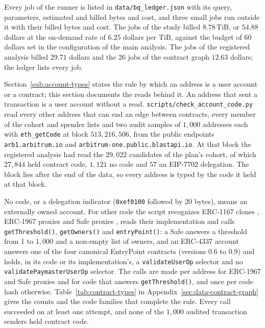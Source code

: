 Every job of the runner is listed in \texttt{data/bq\_ledger.json} with its query, parameters, estimated and billed bytes and cost, and three small jobs run outside it with their billed bytes and cost. The jobs of the study billed $8.78$\,TiB, or $54.88$ dollars at the on-demand rate of $6.25$ dollars per TiB, against the budget of $60$ dollars set in the configuration of the main analysis. The jobs of the registered analysis billed $29.71$ dollars and the 26 jobs of the contract graph $12.63$ dollars; the ledger lists every job.


Section~\ref{sub:account-types} states the rule by which an address is a user account or a contract; this section documents the reads behind it. An address that sent a transaction is a user account without a read. \texttt{scripts/check\_account\_code.py} read every other address that can end an edge between contracts, every member of the cohort and spender lists and two audit samples of $1{,}000$ addresses each with \texttt{eth\_getCode} at block $513{,}216{,}506$, from the public endpoints \texttt{arb1.arbitrum.io} and \texttt{arbitrum-one.public.blastapi.io}. At that block the registered analysis had read the $29{,}022$ candidates of the plan's cohort, of which $27{,}844$ held contract code, $1{,}121$ no code and $57$ an EIP-7702 delegation. The block lies after the end of the data, so every address is typed by the code it held at that block.

No code, or a delegation indicator (\texttt{0xef0100} followed by 20 bytes), means an externally owned account. For other code the script recognizes ERC-1167 clones \parencite{murray2018erc1167}, ERC-1967 proxies \parencite{palladino2019erc1967} and Safe proxies \parencite{safenddocs}, reads their implementation and calls \texttt{getThreshold()}, \texttt{getOwners()} and \texttt{entryPoint()}: a Safe answers a threshold from 1 to $1{,}000$ and a non-empty list of owners, and an ERC-4337 account \parencite{buterin2021erc4337} answers one of the four canonical EntryPoint contracts (versions 0.6 to 0.9) and holds, in its code or its implementation's, a \texttt{validateUserOp} selector and no \texttt{validatePaymasterUserOp} selector. The calls are made per address for ERC-1967 and Safe proxies and for code that answers \texttt{getThreshold()}, and once per code hash otherwise. Table~\ref{tab:contract-types} in Appendix~\ref{sec:data-contract-graph} gives the counts and the code families that complete the rule. Every call succeeded on at least one attempt, and none of the $1{,}000$ audited transaction senders held contract code.

